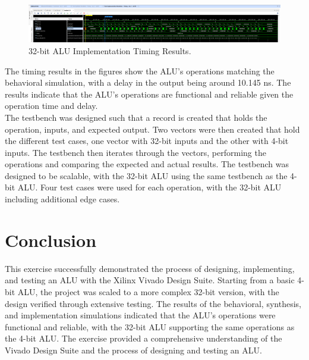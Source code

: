 \documentclass[CMPE]{../KGCOEReport}
\begin{document}
\begin{figure}[H]
    \centering
    \includegraphics[width=1\textwidth]{implement2.png}
    \caption{32-bit ALU Implementation Timing Results.}
    \label{fig:32bit_implementation}
\end{figure}

The timing results in the figures show the ALU's operations matching the behavioral simulation, with a delay in the output being around 10.145 ns. The results indicate that the ALU's operations are functional and reliable given the operation time and delay.\\

The testbench was designed such that a record is created that holds the operation, inputs, and expected output. Two vectors were then created that hold the different test cases, one vector with 32-bit inputs and the other with 4-bit inputs. The testbench then iterates through the vectors, performing the operations and comparing the expected and actual results. The testbench was designed to be scalable, with the 32-bit ALU using the same testbench as the 4-bit ALU. Four test cases were used for each operation, with the 32-bit ALU including additional edge cases.

\section*{Conclusion}

This exercise successfully demonstrated the process of designing, implementing, and testing an ALU with the Xilinx Vivado Design Suite. Starting from a basic 4-bit ALU, the project was scaled to a more complex 32-bit version, with the design verified through extensive testing. The results of the behavioral, synthesis, and implementation simulations indicated that the ALU's operations were functional and reliable, with the 32-bit ALU supporting the same operations as the 4-bit ALU. The exercise provided a comprehensive understanding of the Vivado Design Suite and the process of designing and testing an ALU.
\end{document}
